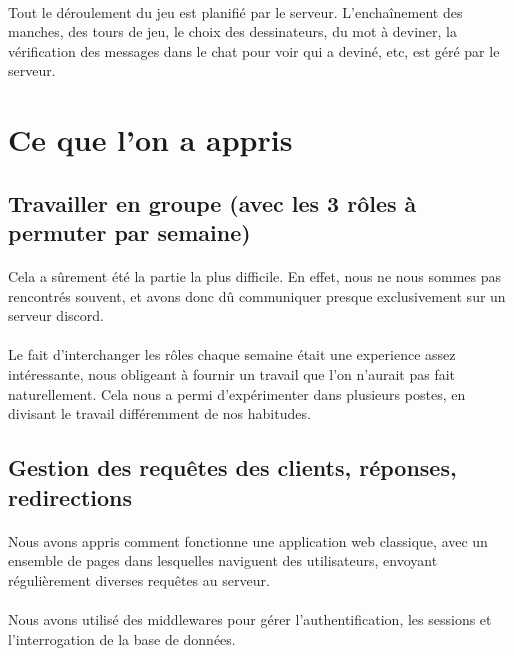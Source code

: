 \documentclass[11pt,a4paper]{article}
\begin{document}
                \paragraph{}
                Tout le déroulement du jeu est planifié par le serveur.
                L'enchaînement des manches, des tours de jeu, le choix des dessinateurs,
                du mot à deviner, la vérification des messages dans le chat pour voir qui a deviné, etc, est géré par le serveur.
    \section{Ce que l'on a appris}
        \subsection*{Travailler en groupe (avec les 3 rôles à permuter par semaine)}
            \paragraph{}
            Cela a sûrement été la partie la plus difficile.
            En effet, nous ne nous sommes pas rencontrés souvent,
            et avons donc dû communiquer presque exclusivement sur un serveur discord.
            \paragraph{}
            Le fait d'interchanger les rôles chaque semaine était une experience assez intéressante,
            nous obligeant à fournir un travail que l'on n'aurait pas fait naturellement.
            Cela nous a permi d'expérimenter dans plusieurs postes,
            en divisant le travail différemment de nos habitudes.
        \subsection*{Gestion des requêtes des clients, réponses, redirections}
            \paragraph{}
            Nous avons appris comment fonctionne une application web classique,
            avec un ensemble de pages dans lesquelles naviguent des utilisateurs,
            envoyant régulièrement diverses requêtes au serveur.
            \paragraph{}
            Nous avons utilisé des middlewares pour gérer l'authentification,
            les sessions et l'interrogation de la base de données.
\end{document}
